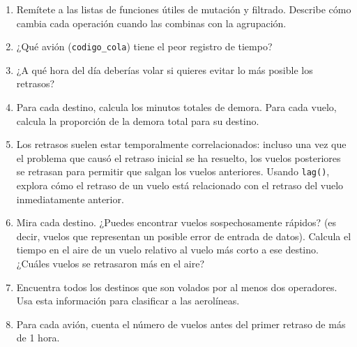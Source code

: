\documentclass[11pt,oneside]{report}
\begin{document}
\begin{enumerate}
\def\labelenumi{\arabic{enumi}.}
\item
  Remítete a las listas de funciones útiles de mutación y filtrado.
  Describe cómo cambia cada operación cuando las combinas con la
  agrupación.
\item
  ¿Qué avión (\texttt{codigo\_cola}) tiene el peor registro de tiempo?
\item
  ¿A qué hora del día deberías volar si quieres evitar lo más posible
  los retrasos?
\item
  Para cada destino, calcula los minutos totales de demora. Para cada
  vuelo, calcula la proporción de la demora total para su destino.
\item
  Los retrasos suelen estar temporalmente correlacionados: incluso una
  vez que el problema que causó el retraso inicial se ha resuelto, los
  vuelos posteriores se retrasan para permitir que salgan los vuelos
  anteriores. Usando \texttt{lag()}, explora cómo el retraso de un vuelo
  está relacionado con el retraso del vuelo inmediatamente anterior.
\item
  Mira cada destino. ¿Puedes encontrar vuelos sospechosamente rápidos?
  (es decir, vuelos que representan un posible error de entrada de
  datos). Calcula el tiempo en el aire de un vuelo relativo al vuelo más
  corto a ese destino. ¿Cuáles vuelos se retrasaron más en el aire?
\item
  Encuentra todos los destinos que son volados por al menos dos
  operadores. Usa esta información para clasificar a las aerolíneas.
\item
  Para cada avión, cuenta el número de vuelos antes del primer retraso
  de más de 1 hora.
\end{enumerate}

\newpage

\thispagestyle{empty}
\pagecolor{myblue}\afterpage{\nopagecolor}

\null
\vfill
\end{document}
